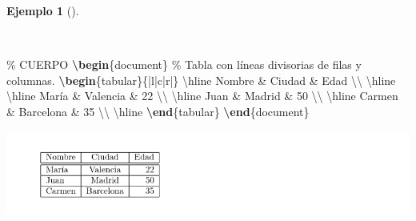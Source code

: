 \documentclass[
  a4paper,
]{scrreport}
\newenvironment{Shaded}{\begin{snugshade}}{\end{snugshade}}
\newcommand{\CommentTok}[1]{\textcolor[rgb]{0.37,0.37,0.37}{#1}}
\newcommand{\ExtensionTok}[1]{\textcolor[rgb]{0.00,0.23,0.31}{#1}}
\newcommand{\FunctionTok}[1]{\textcolor[rgb]{0.28,0.35,0.67}{#1}}
\newcommand{\KeywordTok}[1]{\textcolor[rgb]{0.00,0.23,0.31}{\textbf{#1}}}
\newcommand{\NormalTok}[1]{\textcolor[rgb]{0.00,0.23,0.31}{#1}}
\newcommand{\OperatorTok}[1]{\textcolor[rgb]{0.37,0.37,0.37}{#1}}
\theoremstyle{definition}
\newtheorem{example}{Ejemplo}[chapter]
\theoremstyle{remark}
\begin{document}
\begin{example}[]\protect\hypertarget{exm-tabla-delimitada}{}\label{exm-tabla-delimitada}

~

\begin{Shaded}
\begin{Highlighting}[]
\CommentTok{\% CUERPO}
\KeywordTok{\textbackslash{}begin}\NormalTok{\{}\ExtensionTok{document}\NormalTok{\}}
\CommentTok{\% Tabla con líneas divisorias de filas y columnas.}
\KeywordTok{\textbackslash{}begin}\NormalTok{\{}\ExtensionTok{tabular}\NormalTok{\}\{|l|c|r|\}}
\FunctionTok{\textbackslash{}hline}
\NormalTok{Nombre }\OperatorTok{\&}\NormalTok{ Ciudad }\OperatorTok{\&}\NormalTok{ Edad }\FunctionTok{\textbackslash{}\textbackslash{}} 
\FunctionTok{\textbackslash{}hline}
\FunctionTok{\textbackslash{}hline}
\NormalTok{María }\OperatorTok{\&}\NormalTok{ Valencia }\OperatorTok{\&}\NormalTok{ 22 }\FunctionTok{\textbackslash{}\textbackslash{}}
\FunctionTok{\textbackslash{}hline}
\NormalTok{Juan }\OperatorTok{\&}\NormalTok{ Madrid }\OperatorTok{\&}\NormalTok{ 50 }\FunctionTok{\textbackslash{}\textbackslash{}}
\FunctionTok{\textbackslash{}hline}
\NormalTok{Carmen }\OperatorTok{\&}\NormalTok{ Barcelona }\OperatorTok{\&}\NormalTok{ 35 }\FunctionTok{\textbackslash{}\textbackslash{}}
\FunctionTok{\textbackslash{}hline}
\KeywordTok{\textbackslash{}end}\NormalTok{\{}\ExtensionTok{tabular}\NormalTok{\}}
\KeywordTok{\textbackslash{}end}\NormalTok{\{}\ExtensionTok{document}\NormalTok{\}}
\end{Highlighting}
\end{Shaded}

\begin{tcolorbox}[enhanced jigsaw, colframe=quarto-callout-note-color-frame, opacityback=0, title={Salida}, bottomrule=.15mm, left=2mm, coltitle=black, arc=.35mm, leftrule=.75mm, colback=white, rightrule=.15mm, colbacktitle=quarto-callout-note-color!10!white, toprule=.15mm, breakable, opacitybacktitle=0.6, bottomtitle=1mm, toptitle=1mm, titlerule=0mm]

\includegraphics{img/tablas/tabla-delimitada.png}

\end{tcolorbox}

\end{example}
\end{document}

